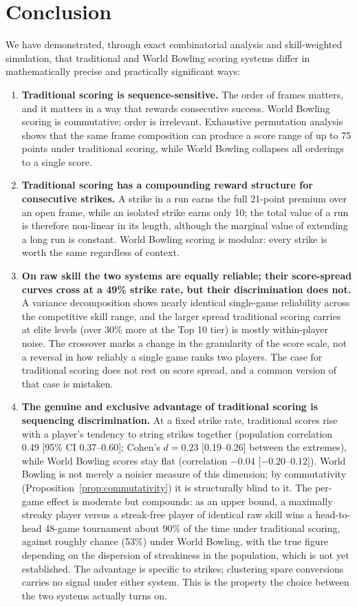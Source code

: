 \documentclass[USenglish]{article}
\theoremstyle{dgthm}
\theoremstyle{dgdef}
\begin{document}
\section{Conclusion}

We have demonstrated, through exact combinatorial analysis and skill-weighted simulation, that traditional and World Bowling scoring systems differ in mathematically precise and practically significant ways:

\begin{enumerate}
  \item \textbf{Traditional scoring is sequence-sensitive.} The order of frames matters, and it matters in a way that rewards consecutive success. World Bowling scoring is commutative; order is irrelevant. Exhaustive permutation analysis shows that the same frame composition can produce a score range of up to 75 points under traditional scoring, while World Bowling collapses all orderings to a single score.
  \item \textbf{Traditional scoring has a compounding reward structure for consecutive strikes.} A strike in a run earns the full 21-point premium over an open frame, while an isolated strike earns only 10; the total value of a run is therefore non-linear in its length, although the marginal value of extending a long run is constant. World Bowling scoring is modular: every strike is worth the same regardless of context.
  \item \textbf{On raw skill the two systems are equally reliable; their score-spread curves cross at a 49\% strike rate, but their discrimination does not.} A variance decomposition shows nearly identical single-game reliability across the competitive skill range, and the larger spread traditional scoring carries at elite levels (over 30\% more at the Top 10 tier) is mostly within-player noise. The crossover marks a change in the granularity of the score scale, not a reversal in how reliably a single game ranks two players. The case for traditional scoring does not rest on score spread, and a common version of that case is mistaken.
  \item \textbf{The genuine and exclusive advantage of traditional scoring is sequencing discrimination.} At a fixed strike rate, traditional scores rise with a player's tendency to string strikes together (population correlation 0.49 [95\% CI 0.37--0.60]; Cohen's $d = 0.23$ [0.19--0.26] between the extremes), while World Bowling scores stay flat (correlation $-0.04$ [$-0.20$--$0.12$]). World Bowling is not merely a noisier measure of this dimension; by commutativity (Proposition~\ref{prop:commutativity}) it is structurally blind to it. The per-game effect is moderate but compounds: as an upper bound, a maximally streaky player versus a streak-free player of identical raw skill wins a head-to-head 48-game tournament about 90\% of the time under traditional scoring, against roughly chance (53\%) under World Bowling, with the true figure depending on the dispersion of streakiness in the population, which is not yet established. The advantage is specific to strikes; clustering spare conversions carries no signal under either system. This is the property the choice between the two systems actually turns on.
\end{enumerate}
\end{document}
